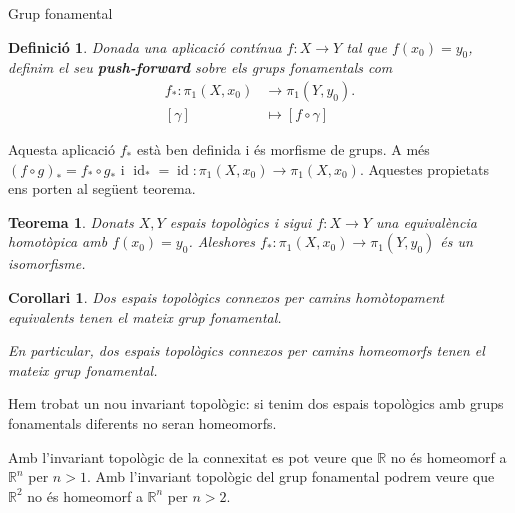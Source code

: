 \documentclass{beamer}
\newtheorem{teorema}{Teorema}
\newtheorem{corollari}{Corol\textperiodcentered lari}
\newtheorem{definicio}{Definici\'{o}}
\theoremstyle{definition}
\DeclareMathOperator{\id}{id}
\begin{document}
\begin{frame}{Grup fonamental}
\begin{definicio}
Donada una aplicaci\'{o} cont\'{i}nua $f:X\rightarrow Y$ tal que $f(x_0)=y_0$, definim el seu \textbf{\emph{push-forward}} sobre els grups fonamentals com
\begin{align*}
f_*:\pi_1(X,x_0)&\longrightarrow\pi_1(Y,y_0).\\
[\gamma]&\longmapsto[f\circ\gamma]
\end{align*}
\end{definicio}
\pause

Aquesta aplicaci\'{o} $f_*$ est\`{a} ben definida i \'{e}s morfisme de grups. A m\'{e}s $(f\circ g)_*=f_*\circ g_*$ i $\id_*=\id:\pi_1(X,x_0)\rightarrow\pi_1(X,x_0)$. Aquestes propietats ens porten al seg\"{u}ent teorema.
\pause

\begin{teorema}
Donats $X,Y$ espais topol\`{o}gics i sigui $f:X\rightarrow Y$ una equival\`{e}ncia homot\`{o}pica amb $f(x_0)=y_0$. Aleshores $f_*:\pi_1(X,x_0)\rightarrow\pi_1(Y,y_0)$ \'{e}s un isomorfisme.
\end{teorema}
\end{frame}

\begin{frame}
\begin{corollari}
Dos espais topol\`{o}gics connexos per camins hom\`{o}topament equivalents tenen el mateix grup fonamental.

En particular, dos espais topol\`{o}gics connexos per camins homeomorfs tenen el mateix grup fonamental.
\end{corollari}
\pause

Hem trobat un nou invariant topol\`{o}gic: si tenim dos espais topol\`{o}gics amb grups fonamentals diferents no seran homeomorfs.
\pause

Amb l'invariant topol\`{o}gic de la connexitat es pot veure que $\mathbb{R}$ no \'{e}s homeomorf a $\mathbb{R}^n$ per $n>1$. Amb l'invariant topol\`{o}gic del grup fonamental podrem veure que $\mathbb{R}^2$ no \'{e}s homeomorf a $\mathbb{R}^n$ per $n>2$.
\end{frame}
\end{document}
